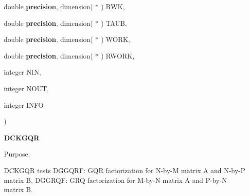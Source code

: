 {\begin{DoxyParamCaption}
\item[{double {\bf precision}, dimension( $\ast$ )}]{B\+W\+K, }
\item[{double {\bf precision}, dimension( $\ast$ )}]{T\+A\+U\+B, }
\item[{double {\bf precision}, dimension( $\ast$ )}]{W\+O\+R\+K, }
\item[{double {\bf precision}, dimension( $\ast$ )}]{R\+W\+O\+R\+K, }
\item[{integer}]{N\+I\+N, }
\item[{integer}]{N\+O\+U\+T, }
\item[{integer}]{I\+N\+F\+O}
\end{DoxyParamCaption}
)}\label{group__double__eig_ga2d542e25f93c07e7fac6bdf79e741bac}


{\bfseries D\+C\+K\+G\+Q\+R} 

\begin{DoxyParagraph}{Purpose\+: }
\begin{DoxyVerb} DCKGQR tests
 DGGQRF: GQR factorization for N-by-M matrix A and N-by-P matrix B,
 DGGRQF: GRQ factorization for M-by-N matrix A and P-by-N matrix B.\end{DoxyVerb}
 
\end{DoxyParagraph}

